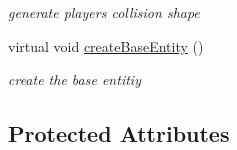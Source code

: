 \begin{DoxyCompactItemize}
\begin{DoxyCompactList}\small\item\em generate player\textquotesingle{}s collision shape \end{DoxyCompactList}\item 
virtual void \hyperlink{class_n_c_t_u_1_1_player_obstacle_ae614fa9be975f30f8413101afb567a1f}{create\+Base\+Entity} ()\hypertarget{class_n_c_t_u_1_1_player_obstacle_ae614fa9be975f30f8413101afb567a1f}{}\label{class_n_c_t_u_1_1_player_obstacle_ae614fa9be975f30f8413101afb567a1f}

\begin{DoxyCompactList}\small\item\em create the base entitiy \end{DoxyCompactList}\end{DoxyCompactItemize}
\subsection*{Protected Attributes}
